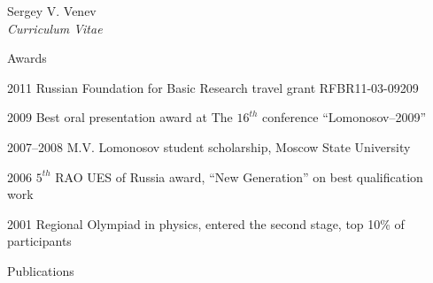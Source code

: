 \documentclass[10pt]{article}
\begin{document}
\begin{cv}{Sergey V. Venev\\{\large \itshape Curriculum Vitae}}
\begin{cvlist}{Awards}
    \item[2011] Russian Foundation for Basic Research travel grant RFBR11-03-09209  
    \item[2009] Best oral presentation award at The $16^{th}$ conference ``Lomonosov--2009''  
    \item[2007--2008] M.V. Lomonosov student scholarship, Moscow State University  
    \item[2006] $5^{th}$ RAO UES of Russia award, ``New Generation'' on best qualification work 
    \item[2001] Regional Olympiad in physics, entered the second stage, top 10\% of participants
\end{cvlist}

\setlength{\oldcvlabelwidth}{\cvlabelwidth}
\setlength{\cvlabelwidth}{1em}
\renewcommand*{\biblabelsep}{1.5em}
% 

\begin{cvlist}{Publications}
    \item


\end{cvlist}
\end{cv}
\end{document}
